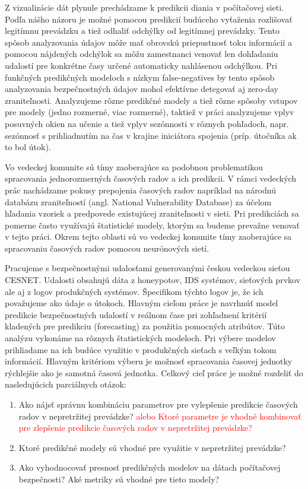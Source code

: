 \documentclass[thesismargins, thesislinespacing, openright, upjsfrontpage, combineabstracts]{rnthesis}
\begin{document}
Z vizualizácie dát plynule prechádzame k predikcii diania v počítačovej sieti. Podľa nášho názoru je možné pomocou predikcií budúceho vyťaženia rozlišovať legitímnu prevádzku a tiež odhaliť odchýlky od legitímnej prevádzky. Tento spôsob analyzovania údajov môže mať obrovskú priepustnosť toku informácií a pomocou nájdených odchýlok sa môžu zamestnanci venovať len dohľadaniu udalostí pre konkrétne časy určené automaticky nahlásenou odchýlkou. Pri funkčných predikčných modeloch s nízkym false-negatives by tento spôsob analyzovania bezpečnostných údajov mohol efektívne detegovať aj zero-day zraniteľnosti. Analyzujeme rôzne predikčné modely a tiež rôzne spôsoby vstupov pre modely (jedno rozmerné, viac rozmerné), taktiež v práci analyzujeme vplyv posuvných okien na učenie a tiež vplyv sezónnosti v rôznych pohľadoch, napr. sezónnosť s prihliadnutím na čas v krajine iniciátora spojenia (príp. útočníka ak to bol útok).

Vo vedeckej komunite sú tímy zaoberajúce sa podobnou problematikou spracovania jednorozmerných časových radov a ich predikcii. V rámci vedeckých prác nachádzame pokusy prepojenia časových radov napríklad na národnú databázu zraniteľností (angl. National Vulnerability Database) za účelom hľadania vzoriek a predpovede existujúcej zraniteľnosti v sieti. Pri predikciách sa pomerne často využívajú štatistické modely, ktorým sa budeme prevažne venovať v tejto práci. Okrem tejto oblasti sú vo vedeckej komunite tímy zaoberajúce sa spracovaniu časových radov pomocou neurónových sietí.

Pracujeme s bezpečnostnými udalosťami generovanými českou vedeckou sieťou CESNET. Udalosti obsahujú dáta z honeypotov, IDS systémov, sieťových prvkov ale aj z logov produkčných systémov. Špecifikom týchto logov je, že ich považujeme ako údaje o útokoch. Hlavným cieľom práce je navrhnúť model predikcie bezpečnostných udalostí v reálnom čase pri zohľadnení kritérií kladených pre predikciu (forecasting) za použitia pomocných atribútov. Túto analýzu vykonáme na rôznych štatistických modeloch. Pri výbere modelov prihliadame na ich budúce využitie v produkčných sieťach s veľkým tokom informácií. Hlavným kritériom výberu je možnosť spracovania časovej jednotky rýchlejšie ako je samotná časová jednotka. Celkový cieľ práce je možné rozdeliť do nasledujúcich parciálnych otázok:

\begin{enumerate}
  \item Ako nájsť správnu kombináciu parametrov pre vylepšenie predikcie časových radov v nepretržitej prevádzke? \textcolor{red}{alebo Ktoré parametre je vhodné kombinovať pre zlepšenie predikcie časových radov v nepretržitej prevádzke?}
  \item Ktoré predikčné modely sú vhodné pre využitie v nepretržitej prevádzke?
  \item Ako vyhodnocovať presnosť predikčných modelov na dátach počítačovej bezpečnosti? Aké metriky sú vhodné pre tieto modely?
\end{enumerate}
\end{document}
